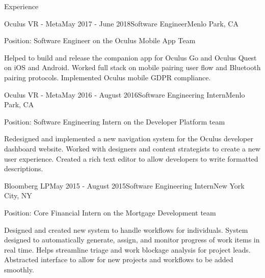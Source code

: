 \documentclass{resume} %
\begin{document}

\begin{rSection}{Experience}

  \begin{rSubsection}{Oculus VR - Meta}{May 2017 - June 2018}{Software Engineer}{Menlo Park, CA}
  \item Position: Software Engineer on the Oculus Mobile App Team
  \item Helped to build and release the companion app for Oculus Go and Oculus
      Quest on iOS and Android. Worked full stack on mobile pairing user flow
      and Bluetooth pairing protocols. Implemented Oculus mobile GDPR
      compliance. 
  \end{rSubsection}


  \begin{rSubsection}{Oculus VR - Meta}{May 2016 - August 2016}{Software Engineering Intern}{Menlo Park, CA}
  \item Position: Software Engineering Intern on the Developer Platform team
  \item Redesigned and implemented a new navigation system for the Oculus
      developer dashboard website. Worked with designers and content strategists
      to create a new user experience. Created a rich text editor to allow
      developers to write formatted descriptions. 
  \end{rSubsection}



  \begin{rSubsection}{Bloomberg LP}{May 2015 - August 2015}{Software Engineering Intern}{New York City, NY}
  \item Position: Core Financial Intern on the Mortgage Development team
  \item Designed and created new system to handle workflows for individuals.
      System designed to automatically generate, assign, and monitor progress of
      work items in real time. Helps streamline triage and work blockage
      analysis for project leads. Abstracted interface to allow for new projects
      and workflows to be added smoothly. 
\end{rSubsection}


\end{rSection}
\end{document}
